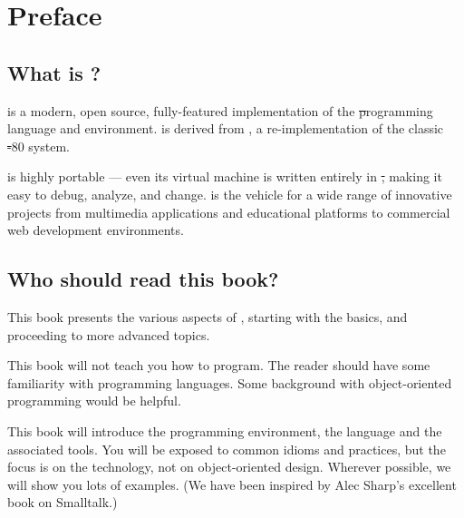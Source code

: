 \documentclass[a4paper,10pt,twoside]{book}
\begin{document}
	\sloppy
	\frontmatter
\fi
\chapter{Preface}\label{cha:intro}

\section*{What is \pharo?}



\pharo is a modern, open source, fully-featured implementation of the \st programming language and environment. \pharo is derived from \squeak, a re-implementation of the classic \st-80 system.


\pharo is highly portable --- even its virtual machine is written entirely in \st, making it easy to debug, analyze, and change. \pharo is the vehicle for a wide range of innovative projects from multimedia applications and educational platforms to commercial web development environments. 

\section*{Who should read this book?}

This book presents the various aspects of \pharo, starting with the basics, and proceeding to more advanced topics.

This book will not teach you how to program. The reader should have some familiarity with programming languages. Some background with object-oriented programming would be helpful.

This book will introduce the \pharo programming environment, the language and the associated tools.  You will be exposed to common idioms and practices, but the focus is on the technology, not on object-oriented design. Wherever possible, we will show you lots of examples. (We have been inspired by Alec Sharp's excellent book on Smalltalk\cite{Shar97a}.)
\end{document}
